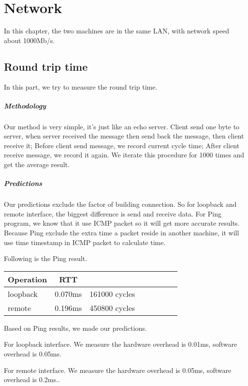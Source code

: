 \chapter{Network}
In this chapter, the two machines are in the same LAN, with network speed about 1000Mb/s.

\section{Round trip time}
In this part, we try to measure the round trip time.

\paragraph{Methodology}
Our method is very simple, it's just like an echo server. Client send one byte to server, when server received the message then send back the message, then client receive it;
Before client send message, we record current cycle time; After client receive message, we record it again. We iterate this procedure for 1000 times and get the average result.


\paragraph{Predictions}
Our predictions exclude the factor of building connection. So for loopback and remote interface, the biggest difference is send and receive data.
For Ping program, we know that it use ICMP packet so it will get more accurate results.
Because Ping exclude the extra time a packet reside in another machine, it will use time timestamp in ICMP packet to calculate time.

Following is the Ping result.
\begin{center}
\begin{tabular}{l*{6}{c}r}
Operation       &  RTT \\
\hline
loopback & 0.070ms & 161000 cycles\\
remote & 0.196ms &  450800 cycles\\
\end{tabular}
\end{center}

Based on Ping results, we made our predictions.

For loopback interface. We measure the hardware overhead is 0.01ms, software overhead is 0.05ms.

For remote interface. We measure the hardware overhead is 0.05ms, software overhead is 0.2ms..

